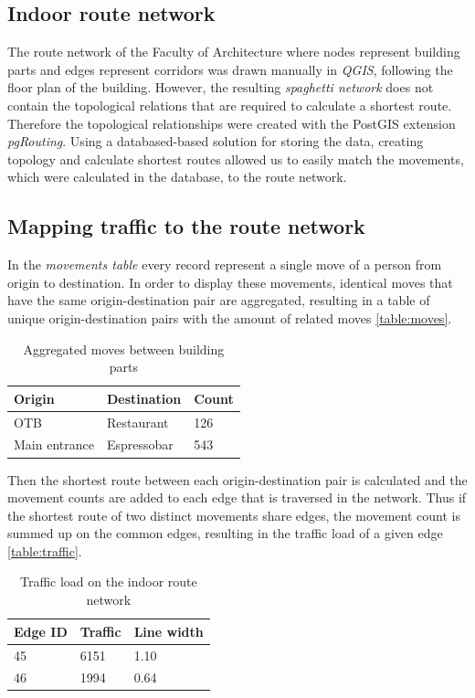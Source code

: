 \subsection{Indoor route network}
The route network of the Faculty of Architecture where nodes represent building
parts and edges represent corridors was drawn manually in \textit{QGIS},
following the floor plan of the building. However, the resulting 
\textit{spaghetti network}
does not contain the topological relations that are required to calculate
a shortest route. Therefore the topological relationships were created with the
PostGIS extension \textit{pgRouting}. Using a databased-based solution for
storing the data, creating topology and calculate shortest routes allowed us to
easily match the movements, which were calculated in the database, to the route
network.

\subsection{Mapping traffic to the route network}
In the \textit{movements table} every record represent a single move of a person
from origin to destination. In order to display these movements, identical moves
that have the same origin-destination pair are aggregated, resulting in a table
of unique origin-destination pairs with the amount of related moves
\autoref{table:moves}.

\begin{table}[H]
\centering
\captionsetup{justification=centering}
\caption{Aggregated moves between building parts}
\label{table:moves}
\begin{tabular}{@{}lll@{}}
\toprule
Origin        & Destination & Count \\ \midrule
OTB           & Restaurant  & 126   \\
Main entrance & Espressobar & 543   \\ \bottomrule
\end{tabular}
\end{table}

Then the shortest route between each origin-destination pair is calculated and
the movement counts are added to each edge that is traversed in the network.
Thus if the shortest route of two distinct movements share edges, the movement
count is summed up on the common edges, resulting in the traffic load of a given
edge \autoref{table:traffic}.

\begin{table}[H]
\centering
\captionsetup{justification=centering}
\caption{Traffic load on the indoor route network}
\label{table:traffic}
\begin{tabular}{@{}lll@{}}
\toprule
Edge ID & Traffic & Line width \\ \midrule
45      & 6151    & 1.10       \\
46      & 1994    & 0.64       \\ \bottomrule
\end{tabular}
\end{table}

